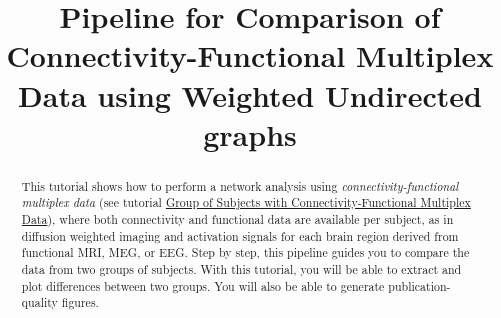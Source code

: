 \documentclass[justified]{tufte-handout}
\title[Comparison of Connectivity-Functional Multiplex Data using WU]{Pipeline for Comparison of Connectivity-Functional Multiplex Data using Weighted Undirected graphs}
\begin{document}
\maketitle

\begin{abstract}
\noindent
This tutorial shows how to perform a network analysis using \emph{connectivity-functional multiplex data} (see tutorial \href{https://github.com/braph-software/BRAPH-2/tree/develop/tutorials/general/tut_gr_con_fun_mp}{Group of Subjects with Connectivity-Functional Multiplex Data}), where both connectivity and functional data are available per subject, as in diffusion weighted imaging and activation signals for each brain region derived from functional MRI, MEG, or EEG. Step by step, this pipeline guides you to compare the data from two groups of subjects.  With this tutorial, you will be able to extract and plot differences between two groups. You will also be able to generate publication-quality figures.
\end{abstract}
\end{document}
